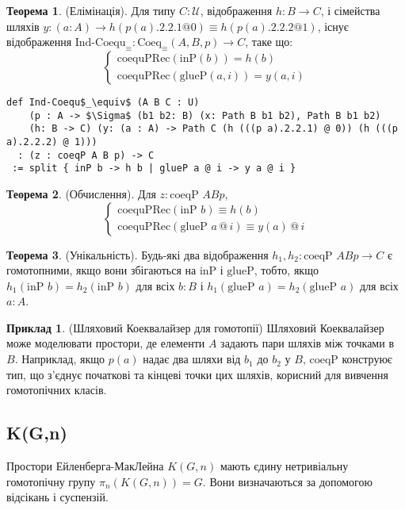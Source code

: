 \documentclass{article}
\theoremstyle{definition}
\newtheorem{theorem}{Теорема}
\newtheorem{example}{Приклад}
\begin{document}
\begin{theorem} (Елімінація).
Для типу \( C : \mathcal{U} \), відображення \( h : B \to C \),
і сімейства шляхів \( y : (a : A) \to h(p(a).2.2.1  @ 0) \equiv h(p(a).2.2.2 @ 1) \),
існує відображення \( \text{Ind-Coequ}_\equiv : \text{Coeq}_\equiv(A,B,p) \to C \), таке що:
\[
\begin{cases}
\text{coequPRec}(\text{inP}(b)) = h(b) \\
\text{coequPRec}(\text{glueP}(a,i)) = y(a,i)
\end{cases}
\]
\begin{lstlisting}[mathescape=true]
def Ind-Coequ$_\equiv$ (A B C : U)
    (p : A -> $\Sigma$ (b1 b2: B) (x: Path B b1 b2), Path B b1 b2)
    (h: B -> C) (y: (a : A) -> Path C (h (((p a).2.2.1) @ 0)) (h (((p a).2.2.2) @ 1)))
  : (z : coeqP A B p) -> C
 := split { inP b -> h b | glueP a @ i -> y a @ i }
\end{lstlisting}
\end{theorem}

\begin{theorem} (Обчислення).
Для \( z : \text{coeqP } A B p \),
\[
\begin{cases}
\text{coequPRec}(\text{inP } b) \equiv h(b) \\
\text{coequPRec}(\text{glueP } a \, @ \, i) \equiv y(a) \, @ \, i
\end{cases}
\]
\end{theorem}

\begin{theorem} (Унікальність).
Будь-які два відображення \( h_1, h_2 : \text{coeqP } A B p \to C \) є гомотопними,
якщо вони збігаються на \( \text{inP} \) і \( \text{glueP} \), тобто,
якщо \( h_1(\text{inP } b) = h_2(\text{inP } b) \) для всіх \( b : B \)
і \( h_1(\text{glueP } a) = h_2(\text{glueP } a) \) для всіх \( a : A \).
\end{theorem}

\begin{example} (Шляховий Коеквалайзер для гомотопії)
Шляховий Коеквалайзер може моделювати простори, де елементи \( A \) задають
пари шляхів між точками в \( B \). Наприклад, якщо \( p(a) \) надає
два шляхи від \( b_1 \) до \( b_2 \) у \( B \), \( \text{coeqP} \) конструює тип,
що з’єднує початкові та кінцеві точки цих шляхів,
корисний для вивчення гомотопічних класів.
\end{example}

\newpage
\subsection{K(G,n)}
Простори Ейленберга-МакЛейна \( K(G,n) \) мають єдину нетривіальну
гомотопічну групу \( \pi_n(K(G,n)) = G \). Вони визначаються за допомогою відсікань і суспензій.
\end{document}
